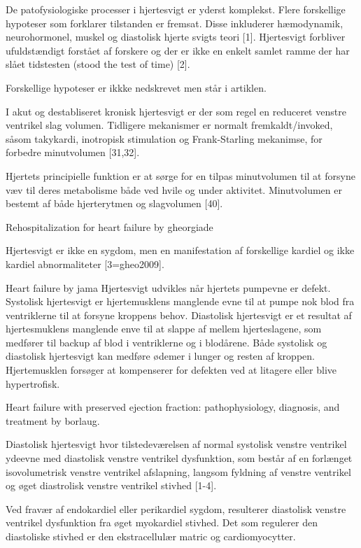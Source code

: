 De patofysiologiske processer i hjertesvigt er yderst komplekst. Flere forskellige hypoteser som forklarer tilstanden er fremsat. Disse inkluderer hæmodynamik, neurohormonel, muskel og diastolisk hjerte svigts teori [1]. Hjertesvigt forbliver ufuldstændigt forstået af forskere og der er ikke en enkelt samlet ramme der har slået tidstesten (stood the test of time) [2]. 

Forskellige hypoteser er ikkke nedskrevet men står i artiklen. 

I akut og destabliseret kronisk hjertesvigt er der som regel en reduceret venstre ventrikel slag volumen. Tidligere mekanismer er normalt fremkaldt/invoked, såsom takykardi, inotropisk stimulation og Frank-Starling mekanimse, for forbedre minutvolumen [31,32]. 

Hjertets principielle funktion er at sørge for en tilpas minutvolumen til at forsyne væv til deres metabolisme både ved hvile og under aktivitet. Minutvolumen er bestemt af både hjerterytmen og slagvolumen [40].

Rehospitalization for heart failure by gheorgiade

Hjertesvigt er ikke en sygdom, men en manifestation af forskellige kardiel og ikke kardiel abnormaliteter [3=gheo2009]. 

Heart failure by jama
Hjertesvigt udvikles når hjertets pumpevne er defekt. Systolisk hjertesvigt er hjertemusklens manglende evne til at pumpe nok blod fra ventriklerne til at forsyne kroppens behov. Diastolisk hjertesvigt er et resultat af hjertesmuklens manglende enve til at slappe af mellem hjerteslagene, som medfører til backup af blod i ventriklerne og i blodårene. Både systolisk og diastolisk hjertesvigt kan medføre ødemer i lunger og resten af kroppen. Hjertemusklen forsøger at kompenserer for defekten ved at litagere eller blive hypertrofisk. 

Heart failure with preserved ejection fraction:
pathophysiology, diagnosis, and treatment by borlaug. 

Diastolisk hjertesvigt hvor tilstedeværelsen af normal systolisk venstre ventrikel ydeevne med diastolisk venstre ventrikel dysfunktion, som består af en forlænget isovolumetrisk venstre ventrikel afslapning, langsom fyldning af venstre ventrikel og øget diastrolisk venstre ventrikel stivhed [1-4]. 

Ved fravær af endokardiel eller perikardiel sygdom, resulterer diastolisk venstre ventrikel dysfunktion fra øget myokardiel stivhed. Det som regulerer den diastoliske stivhed er den ekstracellulær matric og cardiomyocytter. 

